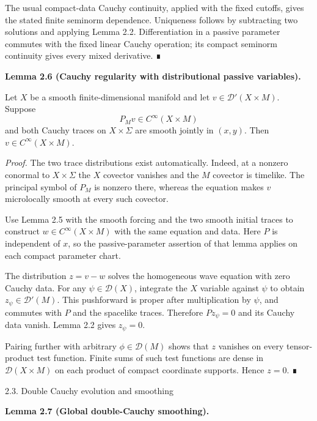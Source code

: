 \documentclass[
  english,
  11pt,
  reqno]{amsart}
\makeatletter
\newcommand{\pandocstatementheading}[1]{%
  \par\addpenalty{\@beginparpenalty}%
  \addvspace{.5\baselineskip plus .2\baselineskip minus .2\baselineskip}%
  {\normalfont\bfseries #1\par}%
  \nobreak\@afterindenttrue\@afterheading
}
\newcommand{\paperstatementsection}{\@startsection{subsection}{2}%
  \z@{.5\linespacing\@plus.7\linespacing}{.35\baselineskip}%
  {\normalfont\bfseries}}
\newcommand{\paperfirststatement}[1]{%
  {\normalfont\bfseries #1\par}%
  \nobreak\@afterindenttrue\@afterheading}
\makeatother
\begin{document}
The usual compact-data Cauchy continuity, applied with the fixed
cutoffs, gives the stated finite seminorm dependence. Uniqueness follows
by subtracting two solutions and applying Lemma 2.2. Differentiation in
a passive parameter commutes with the fixed linear Cauchy operation; its
compact seminorm continuity gives every mixed derivative. ∎

\pandocstatementheading{\protect{}\label{lem:passive-cauchy-regularity}Lemma 2.6 (Cauchy regularity with distributional passive variables).}

Let \(X\) be a smooth finite-dimensional manifold and let
\(v\in\mathcal D'(X\times M)\). Suppose \[
P_Mv\in C^\infty(X\times M)
\] and both Cauchy traces on \(X\times\Sigma\) are smooth jointly in
\((x,y)\). Then \(v\in C^\infty(X\times M)\).

\emph{Proof.} The two trace distributions exist automatically. Indeed,
at a nonzero conormal to \(X\times\Sigma\) the \(X\) covector vanishes
and the \(M\) covector is timelike. The principal symbol of \(P_M\) is
nonzero there, whereas the equation makes \(v\) microlocally smooth at
every such covector.

Use Lemma 2.5 with the smooth forcing and the two smooth initial traces
to construct \(w\in C^\infty(X\times M)\) with the same equation and
data. Here \(P\) is independent of \(x\), so the passive-parameter
assertion of that lemma applies on each compact parameter chart.

The distribution \(z=v-w\) solves the homogeneous wave equation with
zero Cauchy data. For any \(\psi\in\mathcal D(X)\), integrate the \(X\)
variable against \(\psi\) to obtain \(z_\psi\in\mathcal D'(M)\). This
pushforward is proper after multiplication by \(\psi\), and commutes
with \(P\) and the spacelike traces. Therefore \(Pz_\psi=0\) and its
Cauchy data vanish. Lemma 2.2 gives \(z_\psi=0\).

Pairing further with arbitrary \(\phi\in\mathcal D(M)\) shows that \(z\)
vanishes on every tensor-product test function. Finite sums of such test
functions are dense in \(\mathcal D(X\times M)\) on each product of
compact coordinate supports. Hence \(z=0\). ∎

\protect{}\label{sec:double-cauchy-evolution}
\paperstatementsection{2.3. Double Cauchy evolution and
smoothing}\label{double-cauchy-evolution-and-smoothing}
\paperfirststatement{\protect{}\label{lem:global-double-cauchy-smoothing}Lemma 2.7 (Global double-Cauchy smoothing).}
\end{document}
